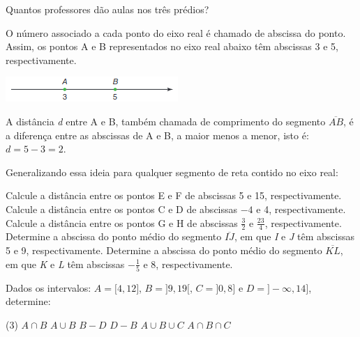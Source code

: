 \documentclass[10pt,a4paper]{article}
\begin{document}
\begin{multicols}{2}
\begin{question}[type=exam]
      Quantos professores dão aulas nos três prédios?
    \end{question}

    \begin{question}[type=exam]
      O número associado a cada ponto do eixo real é chamado de abscissa do ponto. Assim, os pontos A e B representados 
      no eixo real abaixo têm abscissas 3 e 5, respectivamente. 

      \begin{Figure}
        \centering
        \includegraphics[scale=1]{figures/q17.png}
      \end{Figure}

      A distância \textit{d} entre A e B, também chamada de comprimento do segmento $\overline{AB}$, é a diferença entre as 
      abscissas de A e B, a maior menos a menor, isto é: $d = 5 - 3 = 2$. 

      Generalizando essa ideia para qualquer segmento de reta contido no eixo real:

      \begin{tasks}
        \task Calcule a distância entre os pontos E e F de abscissas 5 e 15, respectivamente.
        \task Calcule a distância entre os pontos C e D de abscissas $-4$ e 4, respectivamente. 
        \task Calcule a distância entre os pontos G e H de abscissas $\frac{3}{2}$ e $\frac{23}{4}$, respectivamente. 
        \task Determine a abscissa do ponto médio do segmento $\overline{IJ}$, em que \textit{I} e \textit{J} têm abscissas 5 e 9, respectivamente. 
        \task Determine a abscissa do ponto médio do segmento $\overline{KL}$, em que \textit{K} e \textit{L} têm abscissas $- \frac{1}{5}$ e $8$, respectivamente. 
      \end{tasks}

    \end{question}

    \begin{question}[type=exam]
      Dados os intervalos: $A = \big[4,12\big]$, $B = \big] 9,19\big[$, $C = \big]0,8\big]$ e $D = \big]- \infty,14\big]$, determine:

      \begin{tasks}(3)
        \task $A \cap B$
        \task $A \cup B$
        \task $B - D$
        \task $D - B$
        \task $A \cup B \cup C$
        \task $A \cap B \cap C$
      \end{tasks}
    \end{question}


\end{multicols}
\end{document}
